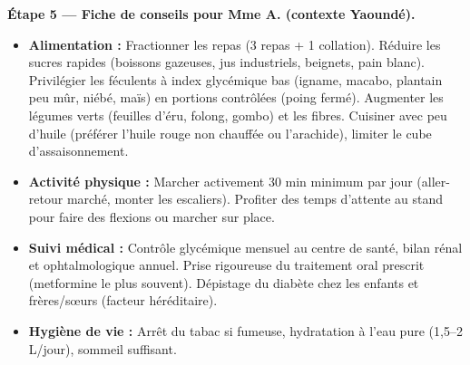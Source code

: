 \documentclass[11pt]{article}
\begin{document}
\begin{exoresolu}
\textbf{Étape 5 — Fiche de conseils pour Mme A. (contexte Yaoundé).}
\begin{itemize}
\item \textbf{Alimentation :} Fractionner les repas (3 repas + 1 collation). Réduire les sucres rapides (boissons gazeuses, jus industriels, beignets, pain blanc). Privilégier les féculents à index glycémique bas (igname, macabo, plantain peu mûr, niébé, maïs) en portions contrôlées (poing fermé). Augmenter les légumes verts (feuilles d'éru, folong, gombo) et les fibres. Cuisiner avec peu d'huile (préférer l'huile rouge non chauffée ou l'arachide), limiter le cube d'assaisonnement.
\item \textbf{Activité physique :} Marcher activement 30 min minimum par jour (aller-retour marché, monter les escaliers). Profiter des temps d'attente au stand pour faire des flexions ou marcher sur place.
\item \textbf{Suivi médical :} Contrôle glycémique mensuel au centre de santé, bilan rénal et ophtalmologique annuel. Prise rigoureuse du traitement oral prescrit (metformine le plus souvent). Dépistage du diabète chez les enfants et frères/sœurs (facteur héréditaire).
\item \textbf{Hygiène de vie :} Arrêt du tabac si fumeuse, hydratation à l'eau pure (1,5--2 L/jour), sommeil suffisant.
\end{itemize}
\end{exoresolu}
\end{document}
